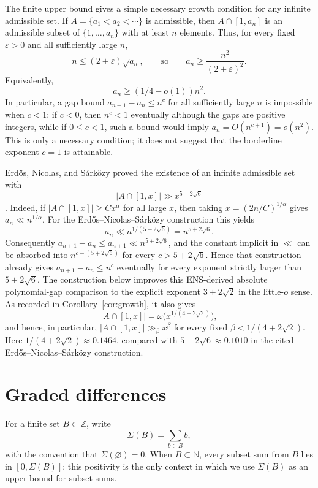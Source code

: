 \documentclass[11pt]{article}
\newcommand{\N}{\mathbb{N}}
\newcommand{\Z}{\mathbb{Z}}
\newcommand{\eps}{\varepsilon}
\newcommand{\Sig}{\Sigma}
\begin{document}
The finite upper bound gives a simple necessary growth condition for any infinite admissible set.  If $A=\{a_1<a_2<\cdots\}$ is admissible, then $A\cap[1,a_n]$ is an admissible subset of $\{1,\ldots,a_n\}$ with at least $n$ elements.  Thus, for every fixed $\eps>0$ and all sufficiently large $n$,
\[
        n\le (2+\eps)\sqrt{a_n},
        \qquad\text{so}\qquad
        a_n\ge \frac{n^2}{(2+\eps)^2}.
\]
Equivalently,
\[
        a_n\ge (1/4-o(1))n^2.
\]
In particular, a gap bound $a_{n+1}-a_n\le n^c$ for all sufficiently large $n$ is impossible when $c<1$: if $c<0$, then $n^c<1$ eventually although the gaps are positive integers, while if $0\le c<1$, such a bound would imply $a_n=O(n^{c+1})=o(n^2)$.  This is only a necessary condition; it does not suggest that the borderline exponent $c=1$ is attainable.

Erd\H{o}s, Nicolas, and S\'ark\"ozy proved the existence of an infinite admissible set with
\[
        |A\cap[1,x]|\gg x^{5-2\sqrt6}
\]
\cite[Theorem~2]{ENS1991}.  Indeed, if $|A\cap[1,x]|\ge Cx^\alpha$ for all large $x$, then taking $x=(2n/C)^{1/\alpha}$ gives $a_n\ll n^{1/\alpha}$.  For the Erd\H{o}s--Nicolas--S\'ark\"ozy construction this yields
\[
        a_n\ll n^{1/(5-2\sqrt6)}=n^{5+2\sqrt6}.
\]
Consequently $a_{n+1}-a_n\le a_{n+1}\ll n^{5+2\sqrt6}$, and the constant implicit in $\ll$ can be absorbed into $n^{c-(5+2\sqrt6)}$ for every $c>5+2\sqrt6$.  Hence that construction already gives $a_{n+1}-a_n\le n^c$ eventually for every exponent strictly larger than $5+2\sqrt6$.  The construction below improves this ENS-derived absolute polynomial-gap comparison to the explicit exponent $3+2\sqrt2$ in the little-$o$ sense.  As recorded in Corollary~\ref{cor:growth}, it also gives
\[
        |A\cap[1,x]|=\omega\bigl(x^{1/(4+2\sqrt2)}\bigr),
\]
and hence, in particular, $|A\cap[1,x]|\gg_\beta x^\beta$ for every fixed $\beta<1/(4+2\sqrt2)$.  Here $1/(4+2\sqrt2)\approx0.1464$, compared with $5-2\sqrt6\approx0.1010$ in the cited Erd\H{o}s--Nicolas--S\'ark\"ozy construction.

\section{Graded differences}

For a finite set $B\subset\Z$, write
\[
        \Sig(B)=\sum_{b\in B}b,
\]
with the convention that $\Sig(\varnothing)=0$.
When $B\subset\N$, every subset sum from $B$ lies in $[0,\Sig(B)]$; this positivity is the only context in which we use $\Sig(B)$ as an upper bound for subset sums.
\end{document}
